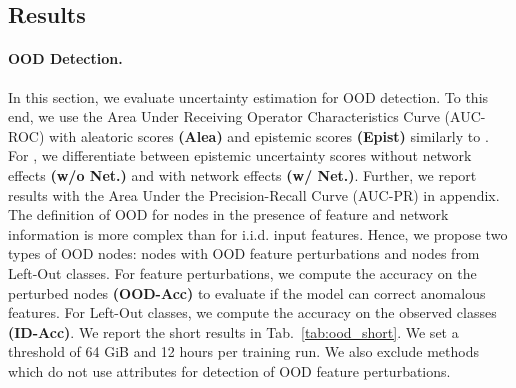 \subsection{Results}
 
\paragraph{OOD Detection.} In this section, we evaluate uncertainty estimation for OOD detection. To this end, we use the Area Under Receiving Operator Characteristics Curve (AUC-ROC) with aleatoric scores  \textbf{(Alea)} and epistemic scores  \textbf{(Epist)} similarly to \citep{charpentier2020, Zhao2020, PriorNetworks, reverse-kl, distribution-distillation, Liu2020a}. For \GPNacro{}, we differentiate between epistemic uncertainty scores without network effects \textbf{(w/o Net.)} and with network effects \textbf{(w/ Net.)}. Further, we report results with the Area Under the Precision-Recall Curve (AUC-PR) in appendix. The definition of OOD for nodes in the presence of feature and network information is more complex than for i.i.d. input features. Hence, we propose two types of OOD nodes: nodes with OOD feature perturbations and nodes from Left-Out classes. For feature perturbations, we compute the accuracy on the perturbed nodes \textbf{(OOD-Acc)} to evaluate if the model can correct anomalous features. For Left-Out classes, we compute the accuracy on the observed classes \textbf{(ID-Acc)}. We report the short results in Tab.~\ref{tab:ood_short}. We set a threshold of 64 GiB and 12 hours per training run. We also exclude methods which do not use attributes for detection of OOD feature perturbations. 


